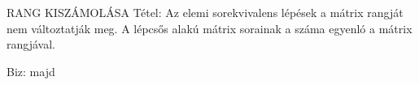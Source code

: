 \documentclass[]{article}
\begin{document}
\begin{framed}
RANG KISZÁMOLÁSA Tétel: Az elemi sorekvivalens lépések a mátrix rangját nem változtatják meg. A lépcsős alakú mátrix sorainak a száma egyenló a mátrix rangjával.
\end{framed}
\begin{leftbar}
Biz: majd
\end{leftbar}
\end{document}
